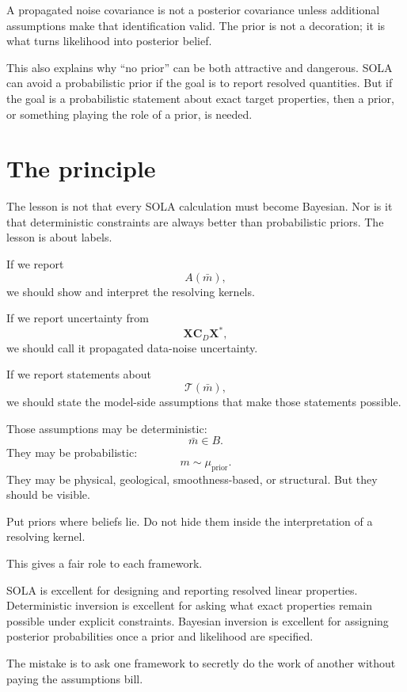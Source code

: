 \documentclass[11pt,openany]{book}
\theoremstyle{definition}
\theoremstyle{remark}
\newcommand{\Tau}{\mathcal{T}}
\begin{document}
\begin{warningbox}
A propagated noise covariance is not a posterior covariance unless additional assumptions make
that identification valid. The prior is not a decoration; it is what turns likelihood into posterior
belief.
\end{warningbox}

This also explains why ``no prior'' can be both attractive and dangerous. SOLA can avoid a
probabilistic prior if the goal is to report resolved quantities. But if the goal is a probabilistic
statement about exact target properties, then a prior, or something playing the role of a prior,
is needed.

\section{The principle}

The lesson is not that every SOLA calculation must become Bayesian. Nor is it that deterministic
constraints are always better than probabilistic priors. The lesson is about labels.

If we report
\[
  A(\bar m),
\]
we should show and interpret the resolving kernels.

If we report uncertainty from
\[
  \mathbf X\mathbf C_D\mathbf X^*,
\]
we should call it propagated data-noise uncertainty.

If we report statements about
\[
  \Tau(\bar m),
\]
we should state the model-side assumptions that make those statements possible.

Those assumptions may be deterministic:
\[
  \bar m\in B.
\]
They may be probabilistic:
\[
  m\sim\mu_{\mathrm{prior}}.
\]
They may be physical, geological, smoothness-based, or structural. But they should be visible.

\begin{lessonbox}
Put priors where beliefs lie. Do not hide them inside the interpretation of a resolving kernel.
\end{lessonbox}

This gives a fair role to each framework.

SOLA is excellent for designing and reporting resolved linear properties. Deterministic inversion
is excellent for asking what exact properties remain possible under explicit constraints. Bayesian
inversion is excellent for assigning posterior probabilities once a prior and likelihood are
specified.

The mistake is to ask one framework to secretly do the work of another without paying the
assumptions bill.
\end{document}
